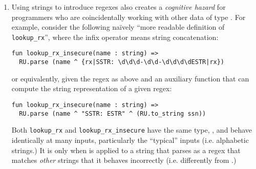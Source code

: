 \begin{enumerate}
\begin{figure}[h]
\begin{lstlisting}[numbers=none]
  fun lookup_rx(name : string) => 
    R.Seq(R.Str name, R.Seq(R.Str "SSTR: ESTR", ssn))
\end{lstlisting}
\caption{Compositional construction of a regex}
\label{fig:lookup_rx}
\end{figure}


We will describe derived forms that do capture the idioms of compositional regex construction in Sec. \ref{sec:syntax-dialects} (in particular, we will compare Figure \ref{fig:lookup_rx} to \ref{fig:derived-spliced-subexpressions}.)

Dynamic string parsing cannot capture the idioms of list construction for the same reason -- list expressions can  contain sub-expressions.


\item Using strings to introduce regexes also creates a \emph{cognitive hazard} for programmers who are coincidentally working with other data of type . For example, consider the following na\"ively ``more readable definition of \lstinline{lookup_rx}'', where the infix operator \li{^} means string concatenation:
\begin{lstlisting}[numbers=none,escapechar=~]
fun lookup_rx_insecure(name : string) => 
  RU.parse (name ^ {rx|SSTR: \d\d\d-\d\d-\d\d\d\dESTR|rx})
\end{lstlisting}

or equivalently, given the regex  as above and an auxiliary function  that can compute the string representation of a given regex:
\begin{lstlisting}[numbers=none,escapechar=~]
fun lookup_rx_insecure(name : string) => 
  RU.parse (name ^ "SSTR: ESTR" ^ (RU.to_string ssn))
\end{lstlisting}

Both \lstinline{lookup_rx} and \lstinline{lookup_rx_insecure} have the same type, , and behave identically at many inputs, particularly the ``typical'' inputs (i.e. alphabetic strings.) It is only when  is applied to a string that parses as a regex that matches \emph{other} strings that it behaves incorrectly (i.e. differently from .)


\end{enumerate}
